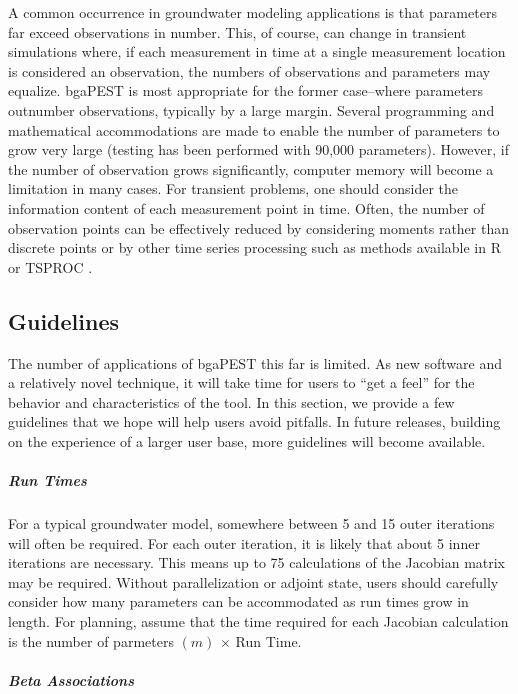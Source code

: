 \documentclass[11pt,oneside,onecolumn]{usgsreport}
\begin{document}
\begin{multicols}{2}
\begin{bibunit}
A common occurrence in groundwater modeling applications is that parameters
far exceed observations in number. This, of course, can change in
transient simulations where, if each measurement in time at a single
measurement location is considered an observation, the numbers of
observations and parameters may equalize. bgaPEST is most appropriate
for the former case--where parameters outnumber observations, typically
by a large margin. Several programming and mathematical accommodations
are made to enable the number of parameters to grow very large (testing
has been performed with 90,000 parameters). However, if the number
of observation grows significantly, computer memory will become a
limitation in many cases. For transient problems, one should consider
the information content of each measurement point in time. Often,
the number of observation points can be effectively reduced by considering
moments rather than discrete points \citep{LiNowakCirpka2005} or
by other time series processing such as methods available in R \citep{R}
or TSPROC \citep{TSPROC}.


\subsection{Guidelines}

The number of applications of bgaPEST this far is limited. As new
software and a relatively novel technique, it will take time for users
to ``get a feel'' for the behavior and characteristics of the tool.
In this section, we provide a few guidelines that we hope will help
users avoid pitfalls. In future releases, building on the experience
of a larger user base, more guidelines will become available.


\subparagraph*{Run Times}

For a typical groundwater model, somewhere between 5 and 15 outer
iterations will often be required. For each outer iteration, it is
likely that about 5 inner iterations are necessary. This means up
to 75 calculations of the Jacobian matrix may be required. Without
parallelization or adjoint state, users should carefully consider
how many parameters can be accommodated as run times grow in length.
For planning, assume that the time required for each Jacobian calculation
is the number of parmeters $\left(m\right)$ $\times$ Run Time. 


\subparagraph*{Beta Associations}


\end{bibunit}
\end{multicols}
\end{document}
